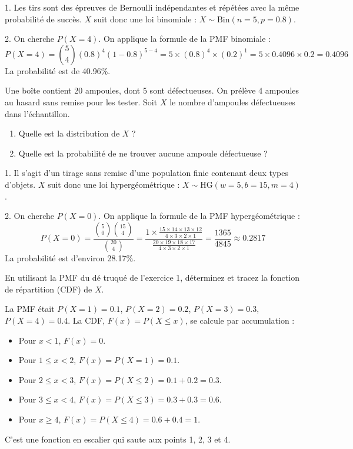 \begin{correctionbox}
1. Les tirs sont des épreuves de Bernoulli indépendantes et répétées avec la même probabilité de succès. $X$ suit donc une loi binomiale : $X \sim \text{Bin}(n=5, p=0.8)$.

2. On cherche $P(X=4)$. On applique la formule de la PMF binomiale :
$$ P(X=4) = \binom{5}{4} (0.8)^4 (1-0.8)^{5-4} = 5 \times (0.8)^4 \times (0.2)^1 = 5 \times 0.4096 \times 0.2 = 0.4096 $$
La probabilité est de 40.96\%.
\end{correctionbox}

\begin{exercicebox}
Une boîte contient 20 ampoules, dont 5 sont défectueuses. On prélève 4 ampoules au hasard sans remise pour les tester. Soit $X$ le nombre d'ampoules défectueuses dans l'échantillon.
\begin{enumerate}
    \item Quelle est la distribution de $X$ ?
    \item Quelle est la probabilité de ne trouver aucune ampoule défectueuse ?
\end{enumerate}
\end{exercicebox}

\begin{correctionbox}
1. Il s'agit d'un tirage sans remise d'une population finie contenant deux types d'objets. $X$ suit donc une loi hypergéométrique : $X \sim \text{HG}(w=5, b=15, m=4)$.

2. On cherche $P(X=0)$. On applique la formule de la PMF hypergéométrique :
$$ P(X=0) = \frac{\binom{5}{0} \binom{15}{4}}{\binom{20}{4}} = \frac{1 \times \frac{15 \times 14 \times 13 \times 12}{4 \times 3 \times 2 \times 1}}{\frac{20 \times 19 \times 18 \times 17}{4 \times 3 \times 2 \times 1}} = \frac{1365}{4845} \approx 0.2817 $$
La probabilité est d'environ 28.17\%.
\end{correctionbox}

\begin{exercicebox}[CDF]
En utilisant la PMF du dé truqué de l'exercice 1, déterminez et tracez la fonction de répartition (CDF) de $X$.
\end{exercicebox}

\begin{correctionbox}
La PMF était $P(X=1)=0.1$, $P(X=2)=0.2$, $P(X=3)=0.3$, $P(X=4)=0.4$.
La CDF, $F(x)=P(X \le x)$, se calcule par accumulation :
\begin{itemize}
    \item Pour $x < 1$, $F(x) = 0$.
    \item Pour $1 \le x < 2$, $F(x) = P(X=1) = 0.1$.
    \item Pour $2 \le x < 3$, $F(x) = P(X \le 2) = 0.1 + 0.2 = 0.3$.
    \item Pour $3 \le x < 4$, $F(x) = P(X \le 3) = 0.3 + 0.3 = 0.6$.
    \item Pour $x \ge 4$, $F(x) = P(X \le 4) = 0.6 + 0.4 = 1$.
\end{itemize}
C'est une fonction en escalier qui saute aux points 1, 2, 3 et 4.
\end{correctionbox}


